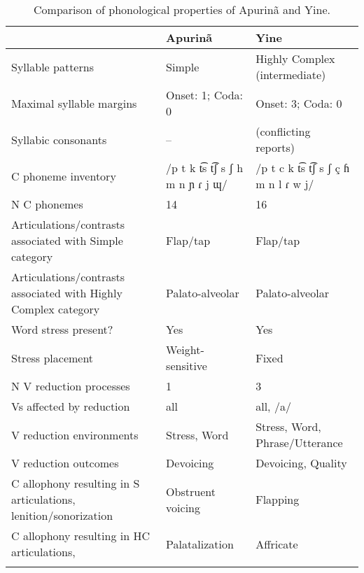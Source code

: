 \begin{table}
\small
\begin{tabularx}{\textwidth}{III}
\lsptoprule
 & {Apurinã} & {Yine}\\
 \midrule 
 {Syllable patterns} & Simple & Highly Complex (intermediate)\\
 \tablevspace
 {Maximal syllable margins} & Onset: 1; Coda: 0 & Onset: 3; Coda: 0\\
 \tablevspace
 {Syllabic consonants} & -- & (conflicting reports)\\
 \tablevspace
 {C phoneme inventory} & /p t k t͡s t͡ʃ s ʃ h m n ɲ ɾ j ɰ/ & /p t c k t͡s t͡ʃ s ʃ ç ɦ m n l ɾ w j/\\
 \tablevspace
 {N C phonemes} & 14 & 16\\
 \tablevspace
 {Articulations/contrasts associated with {Simple}} {category} & {Flap/tap} & {Flap/tap}\\
 \tablevspace
 {Articulations/contrasts associated with {Highly Complex}} {category} & { {Palato-alveolar}} & { {Palato-alveolar}}\\
 \tablevspace
 {Word stress present?} & {Yes} & {Yes}\\
 \tablevspace
 {Stress placement} & {Weight-sensitive} & {Fixed}\\
 \tablevspace
 {N V reduction processes} & {1} & {3}\\
 \tablevspace
 {Vs affected by reduction}  & {all} & {all, /a/}\\
 \tablevspace
 {V reduction environments} & {Stress, Word} & {Stress, Word, Phrase/Utterance}\\
 \tablevspace
 {V reduction outcomes} & {Devoicing} & {Devoicing, Quality}\\
 \tablevspace
 {C allophony resulting in S articulations, lenition/sonorization} & {Obstruent voicing} & { {Flapping}}\\
 \tablevspace
 {{C allophony resulting in HC articulations,} } & {Palatalization} & { {Affricate}}\\
\lspbottomrule
\end{tabularx}
\caption{\label{tab:8.3}Comparison of phonological properties of Apurinã and Yine.}
\end{table}

